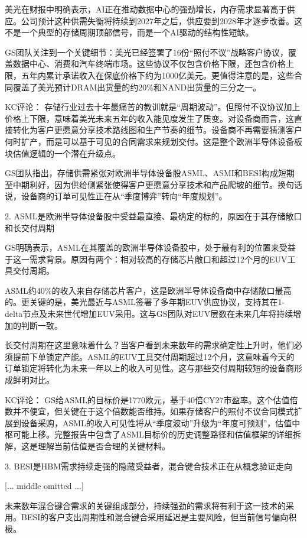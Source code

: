 \documentclass[11pt]{ctexart}
\begin{document}
美光在财报中明确表示，AI正在推动数据中心的强劲增长，内存需求显著高于供应。公司预计这种供需失衡将持续到2027年之后，供应要到2028年才逐步改善。这不是一个典型的存储周期顶部信号，而是一个AI驱动的结构性短缺。

GS团队关注到一个关键细节：美光已经签署了16份“照付不议”战略客户协议，覆盖数据中心、消费和汽车终端市场。这些协议不仅包含价格下限，还包含价格上限，五年内累计承诺收入在保底价格下约为1000亿美元。更值得注意的是，这些合同覆盖了美光预计DRAM出货量的约20\%和NAND出货量的三分之一。

KC评论： 存储行业过去十年最痛苦的教训就是“周期波动”。但照付不议协议加上价格上下限，意味着美光未来五年的收入能见度发生了质变。对设备商而言，这直接转化为客户更愿意分享技术路线图和生产节奏的细节。设备商不再需要猜测客户何时扩产，而是可以基于可见的合同需求来规划交付。这是整个欧洲半导体设备板块估值逻辑的一个潜在升级点。

GS团队指出，存储供需紧张对欧洲半导体设备股ASML、ASMI和BESI构成短期至中期利好，因为供给侧紧张使得客户更愿意分享技术和产品爬坡的细节。换句话说，设备商的订单可见性正在从“季度博弈”转向“年度规划”。

2. ASML是欧洲半导体设备股中受益最直接、最确定的标的，原因在于其存储敞口和长交付周期

GS明确表示，ASML在其覆盖的欧洲半导体设备股中，处于最有利的位置来受益于这一需求背景。原因有两个：相对较高的存储芯片敞口和超过12个月的EUV工具交付周期。

ASML约40\%的收入来自存储芯片客户，这是欧洲半导体设备商中存储敞口最高的。更关键的是，美光最近与ASML签署了多年期EUV供应协议，支持其在1-delta节点及未来世代增加EUV采用。这与GS团队对EUV层数在未来几年将持续增加的判断一致。

长交付周期在这里意味着什么？当客户看到未来数年的需求确定性上升时，他们必须提前下单锁定产能。ASML的EUV工具交付周期超过12个月，这意味着今天的订单锁定将转化为未来一年以上的收入可见性。这与那些交付周期较短的设备商形成鲜明对比。

KC评论： GS给ASML的目标价是1770欧元，基于40倍CY27市盈率。这个估值倍数并不便宜，但关键在于这个倍数能否维持。如果存储客户的照付不议合同模式扩展到设备采购，ASML的收入可见性将从“季度波动”升级为“年度可预测”，估值中枢可能上移。完整报告中包含了ASML目标价的历史调整路径和估值框架的详细拆解，这是理解当前估值是否合理的关键材料。

3. BESI是HBM需求持续走强的隐藏受益者，混合键合技术正在从概念验证走向

[... middle omitted ...]

未来数年混合键合需求的关键组成部分，持续强劲的需求将有利于这一技术的采用。BESI的客户支出周期性和混合键合采用延迟是主要风险，但当前信号偏向积极。
\end{document}
